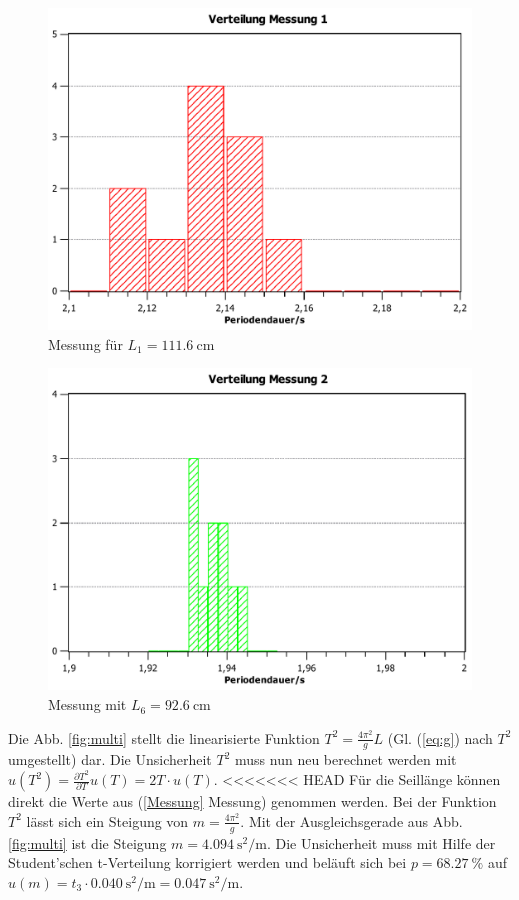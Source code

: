 \documentclass[11pt,a4paper,titlepage, ngerman]{article}
\begin{document}
		\begin{figure}[ht]
			\centering
			\includegraphics[width=\textwidth]{VerteilungMessung1.pdf}
			\caption{Messung für $L_1 = \SI{111,6}{\centi\meter}$}
			\label{fig:Hist1}
		\end{figure}
		\begin{figure}[ht]
			\centering
			\includegraphics[width=\textwidth]{VerteilungMessung2.pdf}
			\caption{Messung mit $L_6 = \SI{92,6}{\centi\meter}$}
			\label{fig:Hist2}
		\end{figure}
			
		Die Abb. \ref{fig:multi} stellt die linearisierte Funktion $T^2 = \frac{4 \pi^2}{g} L$ (Gl. (\ref{eq:g}) nach $T^2$ umgestellt) dar.
		Die Unsicherheit $T^2$ muss nun neu berechnet werden mit $u(T^2) = \frac{\partial T^2}{\partial T} u(T) = 2 T \cdot u(T)$.
<<<<<<< HEAD
		Für die Seillänge können direkt die Werte aus (\ref{Messung} Messung) genommen werden.
		Bei der Funktion $T^2$ lässt sich ein Steigung von $m = \frac{4 \pi^2}{g}$.
		Mit der Ausgleichsgerade aus Abb. \ref{fig:multi} ist die Steigung $m = \SI{4,094}{\second\squared\per\meter}$.
		Die Unsicherheit muss mit Hilfe der Student'schen t-Verteilung korrigiert werden und beläuft sich bei $p = \SI{68,27}{\%}$ auf $u(m) = t_3 \cdot \SI{0,040}{\second\squared\per\meter} = \SI{0,047}{\second\squared\per\meter}$.
		
\end{document}
